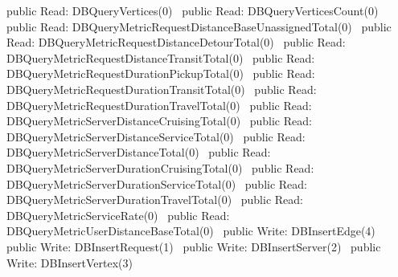 public \LA{}Read: DBQueryVertices(0)~{\nwtagstyle{}}\RA{}
public \LA{}Read: DBQueryVerticesCount(0)~{\nwtagstyle{}}\RA{}
\nwendcode{}\nwdocspar
{}
\nwenddocs{}\plusendmoddef
public \LA{}Read: DBQueryMetricRequestDistanceBaseUnassignedTotal(0)~{\nwtagstyle{}}\RA{}
public \LA{}Read: DBQueryMetricRequestDistanceDetourTotal(0)~{\nwtagstyle{}}\RA{}
public \LA{}Read: DBQueryMetricRequestDistanceTransitTotal(0)~{\nwtagstyle{}}\RA{}
public \LA{}Read: DBQueryMetricRequestDurationPickupTotal(0)~{\nwtagstyle{}}\RA{}
public \LA{}Read: DBQueryMetricRequestDurationTransitTotal(0)~{\nwtagstyle{}}\RA{}
public \LA{}Read: DBQueryMetricRequestDurationTravelTotal(0)~{\nwtagstyle{}}\RA{}
public \LA{}Read: DBQueryMetricServerDistanceCruisingTotal(0)~{\nwtagstyle{}}\RA{}
public \LA{}Read: DBQueryMetricServerDistanceServiceTotal(0)~{\nwtagstyle{}}\RA{}
public \LA{}Read: DBQueryMetricServerDistanceTotal(0)~{\nwtagstyle{}}\RA{}
public \LA{}Read: DBQueryMetricServerDurationCruisingTotal(0)~{\nwtagstyle{}}\RA{}
public \LA{}Read: DBQueryMetricServerDurationServiceTotal(0)~{\nwtagstyle{}}\RA{}
public \LA{}Read: DBQueryMetricServerDurationTravelTotal(0)~{\nwtagstyle{}}\RA{}
public \LA{}Read: DBQueryMetricServiceRate(0)~{\nwtagstyle{}}\RA{}
public \LA{}Read: DBQueryMetricUserDistanceBaseTotal(0)~{\nwtagstyle{}}\RA{}
\nwendcode{}\nwdocspar
{}
\nwenddocs{}\plusendmoddef
public \LA{}Write: DBInsertEdge(4)~{\nwtagstyle{}}\RA{}
public \LA{}Write: DBInsertRequest(1)~{\nwtagstyle{}}\RA{}
public \LA{}Write: DBInsertServer(2)~{\nwtagstyle{}}\RA{}
public \LA{}Write: DBInsertVertex(3)~{\nwtagstyle{}}\RA{}
